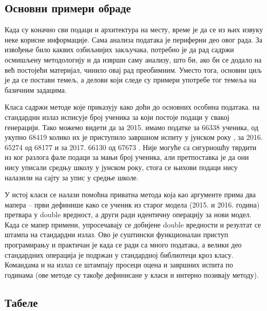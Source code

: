 \subsection{Основни примери обраде}

Када су коначно сви подаци и архитектура на месту, време је да се из њих извуку неке корисне информације. Сама анализа података је периферни део овог рада. За извођење било каквих озбиљнијих закључака, потребно је да рад садржи осмишљену методологију и да изврши саму анализу, што би, ако би се додало на већ постојећи материјал, чинило овај рад преобимним. Уместо тога, основни циљ је да се постави темељ, а делови који следе су примери употребе тог темеља на базичним задацима.

Класа  садржи методе које приказују како доћи до основних особина података.  на стандардни излаз исписује број ученика за који постоје подаци у свакој генерацији. Тако можемо видети да за 2015. имамо податке за 66338 ученика, од укупно 68419 колико их је приступило завршном испиту у јунском року \citep{izvestaj15}, за 2016. 65274 од 68177 \citep{izvestaj16manjine} и за 2017. 66130 од 67673 \citep{izvestaj17manjine}. Није могуће са сигурношћу тврдити из ког разлога фале подаци за мањи број ученика, али претпоставка је да они нису уписали средњу школу у јунском року, стога се њихови подаци нису налазили на сајту за упис у средње школе.

У истој класи се налази помоћна приватна метода  која као аргументе прима два мапера -- први дефинише како се ученик из старог модела (2015. и 2016. година) претвара у double вредност, а други ради идентичну операцију за нови модел. Када се мапер примени, упросечавају се добијене double вредности и резултат се штампа на стандардни излаз. Ово је суштински функционалан приступ програмирању и практичан је када се ради са много података, а велики део стандардних операција је подржан у стандардној библиотеци кроз  класу. Командама  и  на излаз се штампају просеци оцена и завршних испита по годинама (ове методе су такође дефинисане у класи  и интерно позивају  методу).

\subsection{Табеле}

